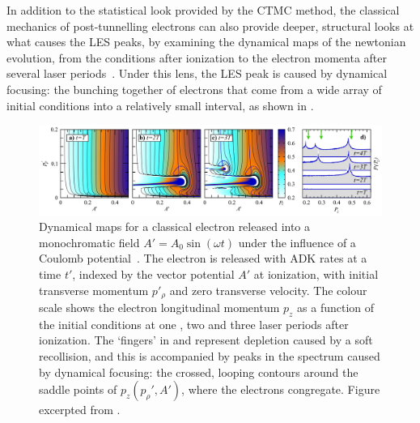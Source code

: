 In addition to the statistical look provided by the CTMC method, the classical mechanics of post-tunnelling electrons can also provide deeper, structural looks at what causes the LES peaks, by examining the dynamical maps of the newtonian evolution, from the conditions after ionization to the electron momenta after several laser periods~\cite{Rost_PRL, Rost_JPhysB}. Under this lens, the LES peak is caused by dynamical focusing: the bunching together of electrons that come from a wide array of initial conditions into a relatively small interval, as shown in .





\begin{figure}[htbp]
  \centering
  \subfloat{\label{f6-kastner-original-figure-a}}
  \subfloat{\label{f6-kastner-original-figure-b}}
  \subfloat{\label{f6-kastner-original-figure-c}}
  \subfloat{\label{f6-kastner-original-figure-d}}
  \includegraphics[width=\textwidth]{6-LES/Figures/figure6I.png}
  \caption[
  Dynamical maps for classical trajectories showing `finger'-like structures and the associated photoelectron bunching, as calculated by A. Kästner~et~al.
  ]{
  Dynamical maps for a classical electron released into a monochromatic field $A'=A_0\sin(\omega t)$ under the influence of a Coulomb potential~\cite{Rost_PRL}. The electron is released with ADK rates at a time $t'$, indexed by the vector potential $A'$ at ionization, with initial transverse momentum $p'_\rho$ and zero transverse velocity. The colour scale shows the electron longitudinal momentum $p_z$ as a function of the initial conditions at one \protect{}, two \protect{} and three \protect{} laser periods after ionization. The `fingers' in \protect{} and \protect{} represent depletion caused by a soft recollision, and this is accompanied by peaks in the spectrum \protect{} caused by dynamical focusing: the crossed, looping contours around the saddle points of $p_z(p_\rho',A')$, where the electrons congregate.
  Figure excerpted from .
  }
\label{f6-kastner-dynamical-focusing}
\end{figure}



